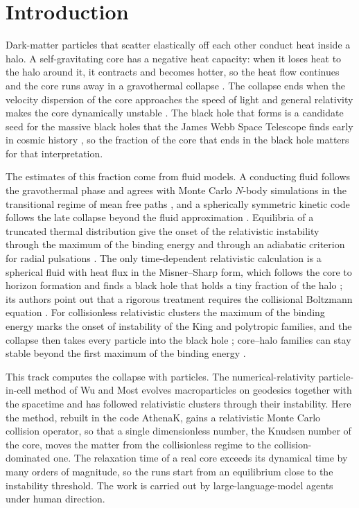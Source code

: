 \documentclass[aps,prd,twocolumn,10pt,superscriptaddress,nofootinbib,longbibliography,floatfix]{revtex4-2}
\begin{document}
\maketitle

\section{Introduction}\label{sec:intro}

Dark-matter particles that scatter elastically off each other conduct heat inside a halo. A self-gravitating core has a negative heat capacity: when it loses heat to the halo around it, it contracts and becomes hotter, so the heat flow continues and the core runs away in a gravothermal collapse \cite{Balberg:2002gt,Koda:2011sidm}. The collapse ends when the velocity dispersion of the core approaches the speed of light and general relativity makes the core dynamically unstable \cite{Balberg:2002bh,Feng:2021instab}. The black hole that forms is a candidate seed for the massive black holes that the James Webb Space Telescope finds early in cosmic history \cite{Feng:2021seed,Feng:2025lrd,Shen:2025lrd}, so the fraction of the core that ends in the black hole matters for that interpretation.

The estimates of this fraction come from fluid models. A conducting fluid follows the gravothermal phase and agrees with Monte Carlo $N$-body simulations in the transitional regime of mean free paths \cite{Koda:2011sidm}, and a spherically symmetric kinetic code follows the late collapse beyond the fluid approximation \cite{Gurian:2025sidm}. Equilibria of a truncated thermal distribution give the onset of the relativistic instability through the maximum of the binding energy and through an adiabatic criterion for radial pulsations \cite{Feng:2021instab}. The only time-dependent relativistic calculation is a spherical fluid with heat flux in the Misner--Sharp form, which follows the core to horizon formation and finds a black hole that holds a tiny fraction of the halo \cite{Gu:2026sidm}; its authors point out that a rigorous treatment requires the collisional Boltzmann equation \cite{Gu:2026sidm}. For collisionless relativistic clusters the maximum of the binding energy marks the onset of instability of the King and polytropic families, and the collapse then takes every particle into the black hole \cite{Gunther:2020ev}; core--halo families can stay stable beyond the first maximum of the binding energy \cite{Gunther:2021ev}.

This track computes the collapse with particles. The numerical-relativity particle-in-cell method of Wu and Most \cite{Wu:2026nrpic} evolves macroparticles on geodesics together with the spacetime and has followed relativistic clusters through their instability. Here the method, rebuilt in the code AthenaK, gains a relativistic Monte Carlo collision operator, so that a single dimensionless number, the Knudsen number of the core, moves the matter from the collisionless regime to the collision-dominated one. The relaxation time of a real core exceeds its dynamical time by many orders of magnitude, so the runs start from an equilibrium close to the instability threshold. The work is carried out by large-language-model agents under human direction.
\end{document}
